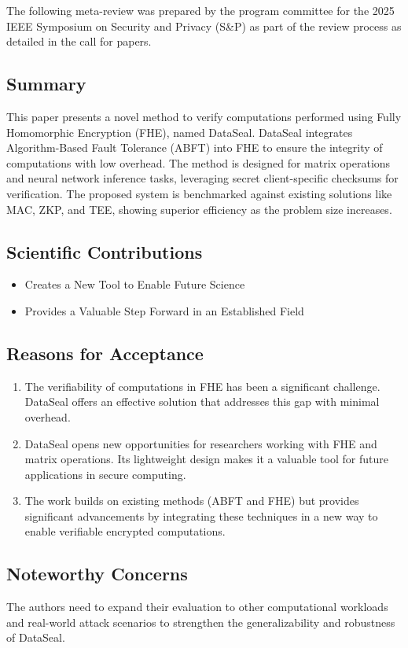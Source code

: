 The following meta-review was prepared by the program committee for the 2025 IEEE Symposium on Security and Privacy (S\&P) as part of the review process as detailed in the call for papers.

\subsection{Summary} This paper presents a novel method to verify computations performed using Fully Homomorphic Encryption (FHE), named DataSeal. DataSeal integrates Algorithm-Based Fault Tolerance (ABFT) into FHE to ensure the integrity of computations with low overhead. The method is designed for matrix operations and neural network inference tasks, leveraging secret client-specific checksums for verification. The proposed system is benchmarked against existing solutions like MAC, ZKP, and TEE, showing superior efficiency as the problem size increases.

\subsection{Scientific Contributions} \begin{itemize} \item Creates a New Tool to Enable Future Science \item Provides a Valuable Step Forward in an Established Field \end{itemize}

\subsection{Reasons for Acceptance} \begin{enumerate} \item The verifiability of computations in FHE has been a significant challenge. DataSeal offers an effective solution that addresses this gap with minimal overhead.

\item DataSeal opens new opportunities for researchers working with FHE and matrix operations. Its lightweight design makes it a valuable tool for future applications in secure computing.

\item The work builds on existing methods (ABFT and FHE) but provides significant advancements by integrating these techniques in a new way to enable verifiable encrypted computations. \end{enumerate}

\subsection {Noteworthy Concerns} The authors need to expand their evaluation to other computational workloads and real-world attack scenarios to strengthen the generalizability and robustness of DataSeal.